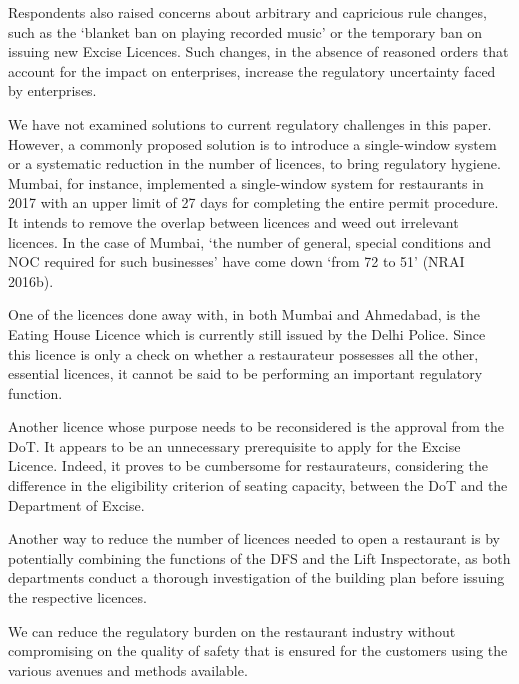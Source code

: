 \documentclass[a4paper, 12pt]{article}
\begin{document}
		Respondents also raised concerns about arbitrary and capricious rule changes, such as the ‘blanket ban on playing recorded music’ or the temporary ban on issuing new Excise Licences. Such changes, in the absence of reasoned orders that account for 
the impact on enterprises, increase the regulatory uncertainty faced by enterprises.
		
		We have not examined solutions to current regulatory challenges in this paper. However, a commonly proposed solution is to introduce a single-window system or a systematic reduction in the number of licences, to bring regulatory hygiene. Mumbai, for 
instance, implemented a single-window system for restaurants in 2017 with an upper limit of 27 days for completing the entire permit procedure. It intends to remove the overlap between licences and weed out irrelevant licences. In the case of Mumbai, ‘the number 
of general, special conditions and NOC required for such businesses’ have come down ‘from 72 to 51’ (NRAI 2016b).
		
		One of the licences done away with, in both Mumbai and Ahmedabad, is the Eating House Licence which is currently still issued by the Delhi Police. Since this licence is only a check on whether a restaurateur possesses all the other, essential licences, it 
cannot be said to be performing an important regulatory function.
		
		Another licence whose purpose needs to be reconsidered is the approval from the DoT. It appears to be an unnecessary prerequisite to apply for the Excise Licence. Indeed, it proves to be cumbersome for restaurateurs, considering the difference in the 
eligibility criterion of seating capacity, between the DoT and the Department of Excise.
		
		Another way to reduce the number of licences needed to open a restaurant is by potentially combining the functions of the DFS and the Lift Inspectorate, as both departments conduct a thorough investigation of the building plan before issuing the 
respective licences.
		
		We can reduce the regulatory burden on the restaurant industry without compromising on the quality of safety that is ensured for the customers using the various avenues and methods available.


                 
                          
\end{document}
